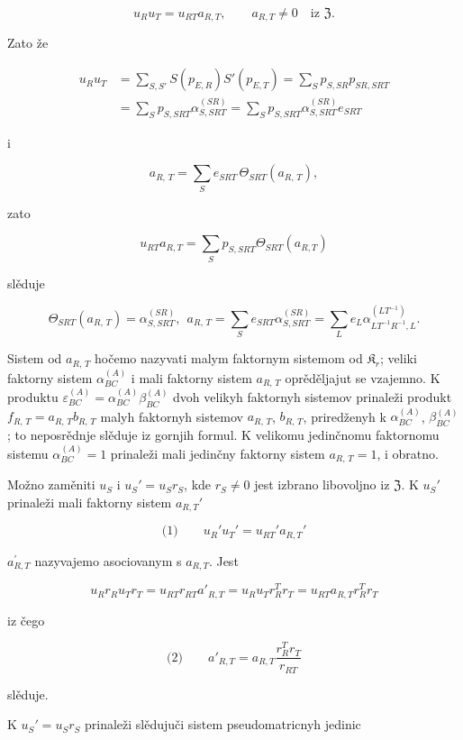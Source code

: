 \documentclass[11pt]{article}
\begin{document}
\[
u_Ru_T=u_{RT}a_{R,T},\qquad a_{R,T}\ne0\quad\text{iz }\mathfrak Z.
\]

Zato že

\[
\begin{aligned}
u_Ru_T
&=\sum_{S,S'} S(p_{E,R})S'(p_{E,T})
=\sum_S p_{S,SR}p_{SR,SRT}\\
&=\sum_S p_{S,SRT}\alpha_{S,SRT}^{(SR)}
=\sum_S p_{S,SRT}\alpha_{S,SRT}^{(SR)}e_{SRT}
\end{aligned}
\]

i

\[a_{R,\,T} = \sum\limits_{S} e_{SRT}\, \Theta_{SRT} \left(a_{R,\,T}\right),\]

zato

\[u_{RT} a_{R,T} = \sum\limits_{S} p_{S,SRT} \Theta_{SRT} (a_{R,T})\]

slěduje

\[\Theta_{SRT}(a_{R,\,T}) = \alpha_{S,SRT}^{(SR)}, ~~ a_{R,\,T} = \sum\limits_{S} e_{SRT} \alpha_{S,SRT}^{(SR)} = \sum\limits_{L} e_{L} \alpha_{LT^{-1}R^{-1},L}^{(LT^{-1})}.\]

Sistem od \(a_{R,\,T}\) hočemo nazyvati malym faktornym sistemom od \(\mathfrak K_r\); veliki faktorny sistem \(\alpha_{BC}^{(A)}\) i mali faktorny sistem \(a_{R,\,T}\) oprěděljajut se vzajemno. K produktu \(\varepsilon_{BC}^{(A)} = \alpha_{BC}^{(A)} \beta_{BC}^{(A)}\) dvoh velikyh faktornyh sistemov prinaleži produkt \(f_{R,\,T} = a_{R,\,T}b_{R,\,T}\) malyh faktornyh sistemov \(a_{R,\,T}\), \(b_{R,\,T}\), priredženyh k \(\alpha_{BC}^{(A)}\), \(\beta_{BC}^{(A)}\); to neposrědnje slěduje iz gornjih formul. K velikomu jedinčnomu faktornomu sistemu \(\alpha_{BC}^{(A)} = 1\) prinaleži mali jedinčny faktorny sistem \(a_{R,\,T} = 1\), i obratno.

Možno zaměniti \(u_S\) i \(u_S'=u_Sr_S\), kde \(r_S\neq 0\) jest izbrano libovoljno iz \(\mathfrak Z\). K \(u_S'\) prinaleži mali faktorny sistem \(a_{R,T}'\)

\[
\text{(1)}\qquad u_R'u_T'=u_{RT}'a_{R,T}'
\]

\(a_{R,T}^{\prime}\) nazyvajemo asociovanym s \(a_{R,T}\). Jest

\[u_R r_R u_T r_T = u_{RT} r_{RT} a'_{R,T} = u_R u_T r_R^T r_T = u_{RT} a_{R,T} r_R^T r_T\]

iz čego

\[
\text{(2)}\qquad a'_{R,T}=a_{R,T}\frac{r_R^T r_T}{r_{RT}}
\]

slěduje.

K \(u_S' = u_S r_S\) prinaleži slědujuči sistem pseudomatricnyh jedinic
\end{document}
